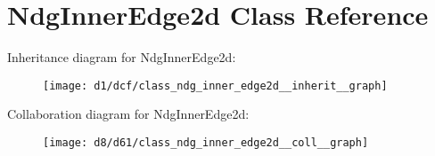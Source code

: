 \hypertarget{class_ndg_inner_edge2d}{}\section{Ndg\+Inner\+Edge2d Class Reference}
\label{class_ndg_inner_edge2d}


Inheritance diagram for Ndg\+Inner\+Edge2d\+:
\nopagebreak
\begin{figure}[H]
\begin{center}
\leavevmode
\texttt{[image: d1/dcf/class\_ndg\_inner\_edge2d\_\_inherit\_\_graph]}
\end{center}
\end{figure}


Collaboration diagram for Ndg\+Inner\+Edge2d\+:
\nopagebreak
\begin{figure}[H]
\begin{center}
\leavevmode
\texttt{[image: d8/d61/class\_ndg\_inner\_edge2d\_\_coll\_\_graph]}
\end{center}
\end{figure}
